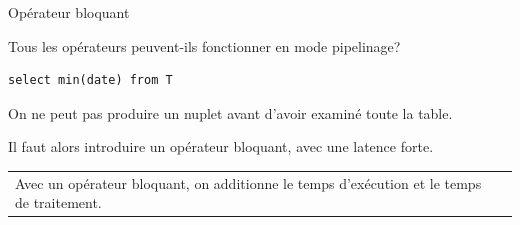 \begin{frame}[fragile]{Opérateur bloquant}

Tous les opérateurs peuvent-ils fonctionner en mode pipelinage?
\medskip

\begin{verbatim}
select min(date) from T
\end{verbatim}

\medskip

On ne peut pas produire un nuplet avant d'avoir
examiné \alert{toute} la table.

\medskip

Il faut alors introduire un opérateur \alert{bloquant},
avec une latence forte. 

\vfill
\begin{tabular}{p{9cm}p{5cm}}
Avec un opérateur bloquant, on \alert{additionne}
le temps d'exécution et le temps de traitement.
&
~
\end{tabular}

\end{frame}


